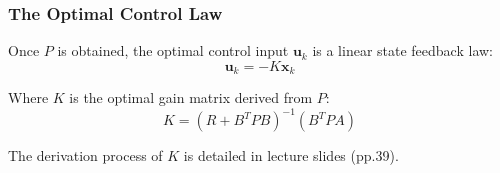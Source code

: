 \documentclass[11pt]{article}
\begin{document}
\subsubsection*{The Optimal Control Law}

Once $P$ is obtained, the optimal control input $\mathbf{u}_k$ is a linear state feedback law:
\begin{equation}
    \mathbf{u}_k = -K \mathbf{x}_k
\end{equation}

Where $K$ is the optimal gain matrix derived from $P$:
\begin{equation}
    K = (R + B^T P B)^{-1} (B^T P A)
\end{equation}

The derivation process of $K$ is detailed in lecture slides (pp.39).
\end{document}
